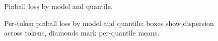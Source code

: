\documentclass[
  a4paper,
  DIV=11,
  numbers=noendperiod]{scrreprt}
\begin{document}
\begin{figure}


\caption{\label{fig-pinball-by-quantile-by-model}Pinball loss by model
and quantile.}

\end{figure}%

\begin{figure}


\caption{\label{fig-pinball-per-token}Per-token pinball loss by model
and quantile; boxes show dispersion across tokens, diamonds mark
per-quantile means.}

\end{figure}%
\end{document}
